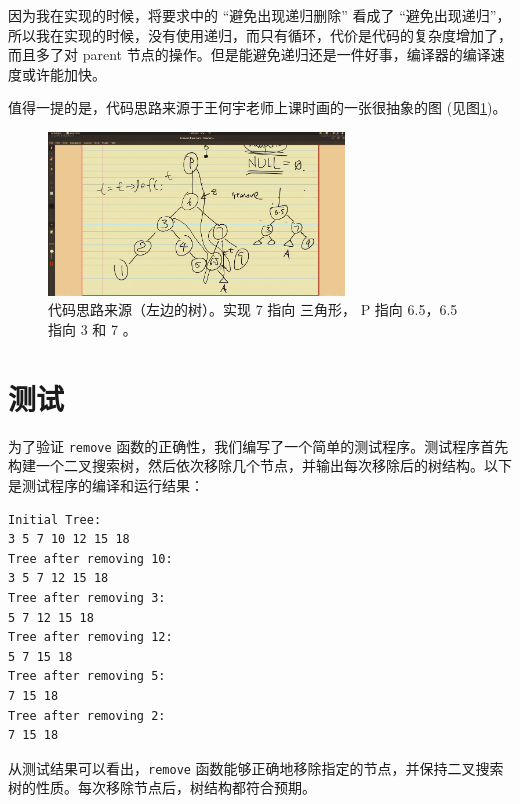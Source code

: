 \documentclass[UTF8]{ctexart}
\begin{document}
因为我在实现的时候，将要求中的 “避免出现递归删除” 看成了 “避免出现递归”，所以我在实现的时候，没有使用递归，而只有循环，代价是代码的复杂度增加了，而且多了对 parent 节点的操作。但是能避免递归还是一件好事，编译器的编译速度或许能加快。

值得一提的是，代码思路来源于王何宇老师上课时画的一张很抽象的图 (见图\ref{fig:inspiration})\cite{DS_1029_course}。
\begin{figure}
    \centering
    \includegraphics[width=0.7\textwidth]{./img/inspiration.png}
    \caption{代码思路来源（左边的树）。实现 7 指向 三角形， P 指向 6.5，6.5 指向 3 和 7 。}
    \label{fig:inspiration}
\end{figure}

\section{测试}

为了验证 \texttt{remove} 函数的正确性，我们编写了一个简单的测试程序。测试程序首先构建一个二叉搜索树，然后依次移除几个节点，并输出每次移除后的树结构。以下是测试程序的编译和运行结果：

\begin{verbatim}
Initial Tree:
3 5 7 10 12 15 18
Tree after removing 10:
3 5 7 12 15 18
Tree after removing 3:
5 7 12 15 18
Tree after removing 12:
5 7 15 18
Tree after removing 5:
7 15 18
Tree after removing 2:
7 15 18
\end{verbatim}

从测试结果可以看出，\texttt{remove} 函数能够正确地移除指定的节点，并保持二叉搜索树的性质。每次移除节点后，树结构都符合预期。
\end{document}
